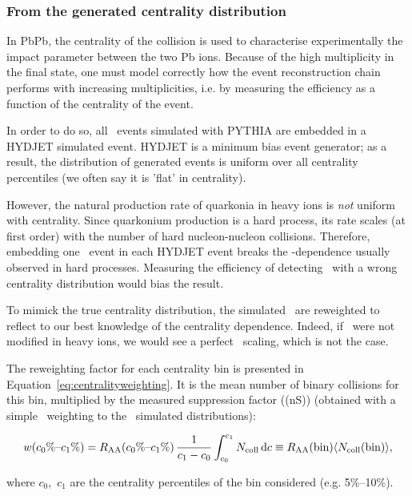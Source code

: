 \subsubsection*{From the generated centrality distribution}
In PbPb, the centrality of the collision is used to characterise
experimentally the impact parameter between the two Pb ions. Because
of the high multiplicity in the final state, one must model
correctly how the event reconstruction chain performs with increasing
multiplicities, i.e. by measuring the efficiency as a function of the
centrality of the event. 

In order to do so, all \PgU\ events simulated with PYTHIA are embedded in a HYDJET
simulated event. HYDJET is a minimum bias event generator; as a
result, the distribution of generated events is uniform over all
centrality percentiles (we often say it is 'flat' in centrality).

However, the natural production rate of quarkonia in heavy ions is
\textit{not} uniform with centrality. Since quarkonium production is a
hard process, its rate scales (at first order) with the number of hard
nucleon-nucleon collisions. Therefore, embedding one \PgU\ event
in each HYDJET event breaks the \Ncoll-dependence usually observed in
hard processes. Measuring the efficiency of detecting \PgU\ with a
wrong centrality distribution would bias the result.

To mimick the true centrality distribution, the simulated \PgU\ are
reweighted to reflect to our best knowledge of the centrality
dependence. Indeed, if \PgU\ were not modified in heavy ions, we would
see a perfect \Ncoll\ scaling, which is not the case. 

The reweighting factor for each centrality bin is presented in
Equation~\ref{eq:centralityweighting}. It is the mean number of binary collisions for this
bin, multiplied by the measured suppression factor \RAA(\PgU(nS)) (obtained with a simple
\Ncoll\ weighting to the \PgU\ simulated distributions):

\begin{equation}
w(c_{0}\textrm{\%}\text{--} c_{1}\textrm{\%}) =R_{\rm AA}(c_{0}\textrm{\%}\text{--}c_{1}\textrm{\%})\,
\frac{1}{c_{1}-c_{0}} \int_{c_{0}}^{c_{1}} N_{\rm coll} \,\mathrm{d}c \equiv
R_{\rm AA}(\textrm{bin})\langle N_{\rm coll} (\textrm{bin}) \rangle,
\label{eq:centralityweighting}
\end{equation}

where $c_0$,~$c_1$ are the centrality percentiles of the bin
considered (e.g. 5\%--10\%).


